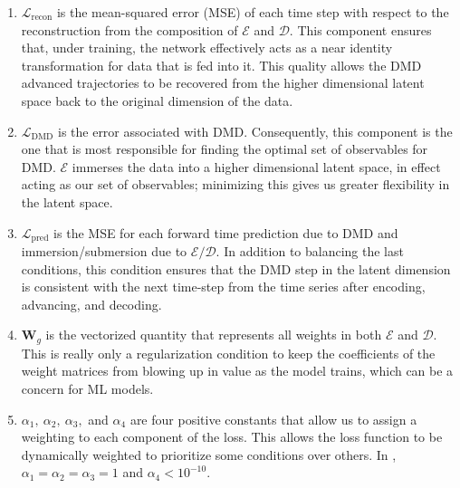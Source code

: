 \begin{enumerate}
    \item $\mathcal{L}_{\text{recon}}$ is the mean-squared error (MSE) of each time step
    with respect to the reconstruction from the composition of $\mathcal{E}$ and $\mathcal{D}$. 
    This component ensures that, under training, the network effectively acts as a near identity 
    transformation for data that is fed into it. This quality allows the DMD advanced trajectories 
    to be recovered from the higher dimensional latent space back to the original dimension of 
    the data.
    
    \item $\mathcal{L}_{\text{DMD}}$ is the error associated with DMD. Consequently, this 
    component is the one that is most responsible for finding the optimal set of observables for DMD.
    $\mathcal{E}$ immerses the data into a higher dimensional latent space, in effect acting as our 
    set of observables; minimizing this gives us greater flexibility in the latent space.
    
    \item $\mathcal{L}_{\text{pred}}$ is the MSE for each forward time prediction due to DMD and 
    immersion/submersion due to $\mathcal{E}/\mathcal{D}$. In addition to balancing the last conditions, 
    this condition ensures that the DMD step in the latent dimension is consistent with the next time-step from 
    the time series after encoding, advancing, and decoding.  
    
    \item $\boldsymbol{W}_g$ is the vectorized quantity that represents all weights in both $\mathcal{E}$
    and $\mathcal{D}$. This is really only a regularization condition to keep the coefficients of the 
    weight matrices from blowing up in value as the model trains, which can be a 
    concern for ML models.
    
    \item $\alpha_1,\ \alpha_2,\ \alpha_3,$ and $\alpha_4$ are four positive constants that allow us to assign a 
    weighting to each component of the loss. This allows the loss function to be dynamically weighted to 
    prioritize some conditions over others. In \cite{lago}, $\alpha_1 = \alpha_2 = \alpha_3 = 1$ and 
    $\alpha_4 < 10^{-10}$.
\end{enumerate}

